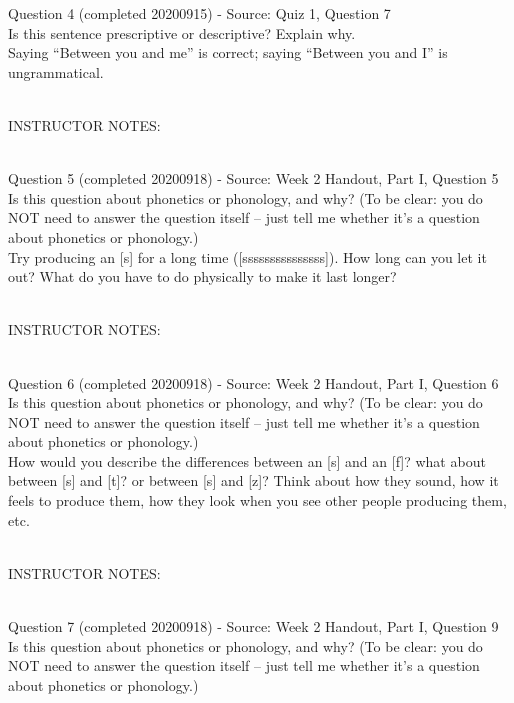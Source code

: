 \documentclass[12pt]{article}
\begin{document}
{\large Question 4} (completed 20200915) - Source: Quiz 1, Question 7\\

Is this sentence prescriptive or descriptive? Explain why.\\

Saying ``Between you and me'' is correct; saying ``Between you and I'' is ungrammatical.


~\\
INSTRUCTOR NOTES: 


~\\

{\large Question 5} (completed 20200918) - Source: Week 2 Handout, Part I, Question 5\\

Is this question about phonetics or phonology, and why? (To be clear: you do NOT need to answer the question itself -- just tell me whether it's a question about phonetics or phonology.)\\

Try producing an {[s]} for a long time ({[sssssssssssssss]}). How long can you let it out? What do you have to do physically to make it last longer?


~\\
INSTRUCTOR NOTES: 


~\\

{\large Question 6} (completed 20200918) - Source: Week 2 Handout, Part I, Question 6\\

Is this question about phonetics or phonology, and why? (To be clear: you do NOT need to answer the question itself -- just tell me whether it's a question about phonetics or phonology.)\\

How would you describe the differences between an {[s]} and an {[f]}? what about between {[s]} and {[t]}? or between {[s]} and {[z]}? Think about how they sound, how it feels to produce them, how they look when you see other people producing them, etc.


~\\
INSTRUCTOR NOTES: 


~\\

{\large Question 7} (completed 20200918) - Source: Week 2 Handout, Part I, Question 9\\

Is this question about phonetics or phonology, and why? (To be clear: you do NOT need to answer the question itself -- just tell me whether it's a question about phonetics or phonology.)\\
\end{document}

